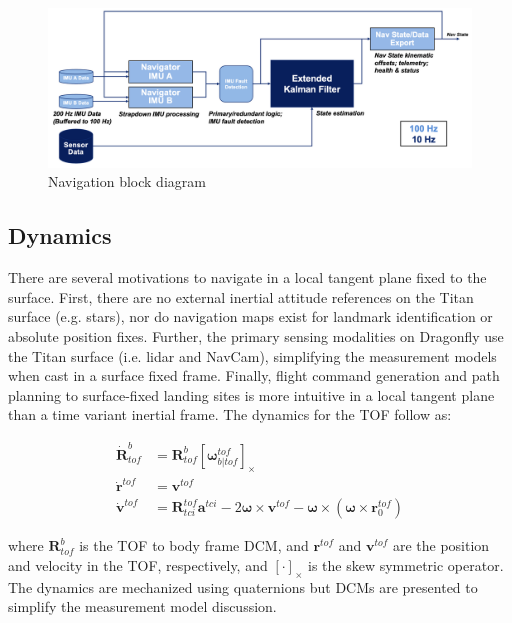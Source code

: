 \begin{figure}[htb]
	\centering\includegraphics[width=6in]{content/figures/nav_block_diagram.png}
	\caption{Navigation block diagram}
	\label{fig:nav_block_diagram}
\end{figure}

\subsection{Dynamics}

There are several motivations to navigate in a local tangent plane fixed to the surface. First, there are no external inertial attitude references on the Titan surface (e.g. stars), nor do navigation maps exist for landmark identification or absolute position fixes. Further, the primary sensing modalities on Dragonfly use the Titan surface (i.e. lidar and \ac{NavCam}), simplifying the measurement models when cast in a surface fixed frame. Finally, flight command generation and path planning to surface-fixed landing sites is more intuitive in a local tangent plane than a time variant inertial frame. The dynamics for the TOF follow as:~\cite{rogers} 

\begin{equation}
\begin{aligned}
\dot{\bm{R}}_{tof}^{b} &= \bm{R}_{tof}^{b} \left[\bm{\omega}_{b|tof}^{tof}\right]_{\times} \\
\dot{\bm{r}}^{tof} &= \bm{v}^{tof} \\
\dot{\bm{v}}^{tof} &= \bm{R}_{tci}^{tof}\bm{a}^{tci} - 2\bm{\omega} \times \bm{v}^{tof} - \bm{\omega} \times \left( \bm{\omega} \times \bm{r}_{0}^{tof}\right)
\end{aligned}
\end{equation}

\noindent where $\bm{R}_{tof}^{b}$ is the \ac{TOF} to body frame \ac{DCM}, and $\bm{r}^{tof}$ and $\bm{v}^{tof}$ are the position and velocity in the \ac{TOF}, respectively, and $\left[\cdot\right]_{\times}$ is the skew symmetric operator. The dynamics are mechanized using quaternions but \acp{DCM} are presented to simplify the measurement model discussion. 

